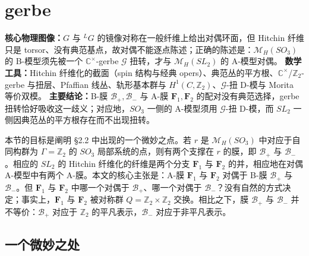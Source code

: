 

\section{gerbe}

\begin{keytakeaway}
\textbf{核心物理图像：}$G$ 与 ${}^{L}G$ 的镜像对称在一般纤维上给出对偶环面，但 Hitchin 纤维只是 torsor、没有典范基点，故对偶不能逐点陈述；正确的陈述是：$\mathcal{M}_H(SO_3)$ 的 B-模型须先被一个 $\mathbb{C}^\times$-gerbe $\mathcal{G}$ 扭转，才与 $\mathcal{M}_H(SL_2)$ 的 A-模型对偶。
\textbf{数学工具：}Hitchin 纤维化的截面（spin 结构与经典 opers）、典范丛的平方根、$\mathbb{C}^\times$/$\mathbb{Z}_2$-gerbe 与扭层、Pfaﬃan 线丛、轨形基本群与 $H^1(C,\mathbb{Z}_2)$、$\mathcal{G}$-扭 D-模与 Morita 等价双模。
\textbf{主要结论：}B-膜 $\mathcal{B}_+,\mathcal{B}_-$ 与 A-膜 $\boldsymbol{F}_1,\boldsymbol{F}_2$ 的配对没有典范选择，gerbe 扭转恰好吸收这一歧义；对应地，$SO_3$ 一侧的 A-模型须用 $\mathcal{G}$-扭 D-模，而 $SL_2$ 一侧因典范丛的平方根存在而不出现扭转。
\end{keytakeaway}

本节的目标是阐明 §2.2 中出现的一个微妙之点。若 $r$ 是 $\mathcal{M}_H(SO_3)$ 中对应于自同构群为 $\Gamma=\mathbb{Z}_2$ 的 $SO_3$ 局部系统的点，则有两个支撑在 $r$ 的膜，即 $\mathcal{B}_+$ 与 $\mathcal{B}_-$。相应的 $SL_2$ 的 Hitchin 纤维化的纤维是两个分支 $\boldsymbol{F}_1$ 与 $\boldsymbol{F}_2$ 的并，相应地在对偶 A-模型中有两个 A-膜。本文的核心主张是：A-膜 $\boldsymbol{F}_1$ 与 $\boldsymbol{F}_2$ 对偶于 B-膜 $\mathcal{B}_+$ 与 $\mathcal{B}_-$。但 $\boldsymbol{F}_1$ 与 $\boldsymbol{F}_2$ 中哪一个对偶于 $\mathcal{B}_+$、哪一个对偶于 $\mathcal{B}_-$？没有自然的方式决定；事实上，$\boldsymbol{F}_1$ 与 $\boldsymbol{F}_2$ 被对称群 $Q=\mathbb{Z}_2\times\mathbb{Z}_2$ 交换。相比之下，膜 $\mathcal{B}_+$ 与 $\mathcal{B}_-$ 并不等价：$\mathcal{B}_+$ 对应于 $\mathbb{Z}_2$ 的平凡表示，$\mathcal{B}_-$ 对应于非平凡表示。

\subsection{一个微妙之处}

